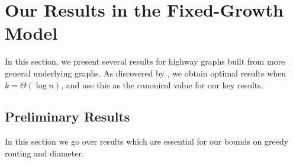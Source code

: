 \section{Our Results in the Fixed-Growth Model}

In this section, we present several results for highway graphs built from more
general underlying graphs.
As discovered by \cite{gila2023highway}, we obtain optimal results when $k =
\Theta(\log n)$, and use this as the canonical value for our key results.

\subsection{Preliminary Results}

In this section we go over results which are essential for 
our bounds on greedy routing and diameter.

